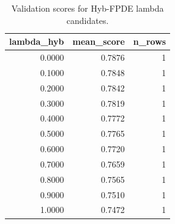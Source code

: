 \begin{table}[t]
\caption{Validation scores for Hyb-FPDE lambda candidates.}
\label{tab:lambda_distribution_computed}
\centering
\begin{tabular}{rrr}
\toprule
lambda\_hyb & mean\_score & n\_rows \\
\midrule
0.0000 & 0.7876 & 1 \\
0.1000 & 0.7848 & 1 \\
0.2000 & 0.7842 & 1 \\
0.3000 & 0.7819 & 1 \\
0.4000 & 0.7772 & 1 \\
0.5000 & 0.7765 & 1 \\
0.6000 & 0.7720 & 1 \\
0.7000 & 0.7659 & 1 \\
0.8000 & 0.7565 & 1 \\
0.9000 & 0.7510 & 1 \\
1.0000 & 0.7472 & 1 \\
\bottomrule
\end{tabular}

\end{table}
